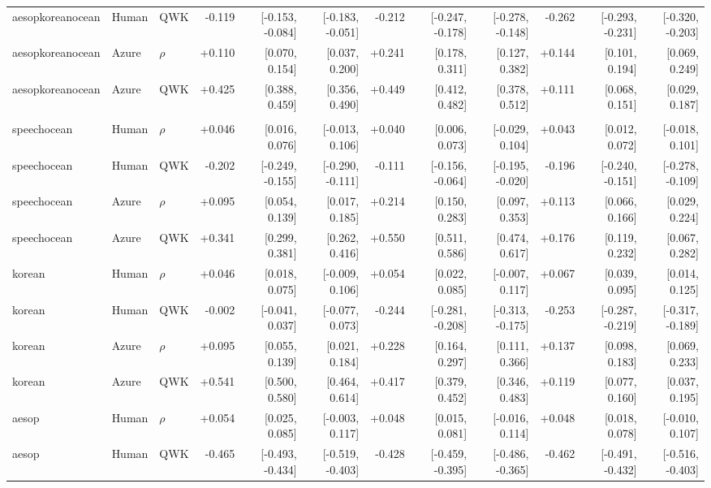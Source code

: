 \documentclass[10pt]{article}
\begin{document}
\begin{landscape}
\begin{longtable}{@{}lllrrrrrrrrr@{}}
aesopkoreanocean & Human & QWK & -0.119 & [-0.153, -0.084] & [-0.183, -0.051] & -0.212 & [-0.247, -0.178] & [-0.278, -0.148] & -0.262 & [-0.293, -0.231] & [-0.320, -0.203]\\
aesopkoreanocean & Azure & $\rho$ & +0.110 & [0.070, 0.154] & [0.037, 0.200] & +0.241 & [0.178, 0.311] & [0.127, 0.382] & +0.144 & [0.101, 0.194] & [0.069, 0.249]\\
aesopkoreanocean & Azure & QWK & +0.425 & [0.388, 0.459] & [0.356, 0.490] & +0.449 & [0.412, 0.482] & [0.378, 0.512] & +0.111 & [0.068, 0.151] & [0.029, 0.187]\\
\addlinespace[2pt]
\midrule\multicolumn{12}{l}{\textbf{D: accuracy MAE}}\\*
speechocean & Human & $\rho$ & +0.046 & [0.016, 0.076] & [-0.013, 0.106] & +0.040 & [0.006, 0.073] & [-0.029, 0.104] & +0.043 & [0.012, 0.072] & [-0.018, 0.101]\\
speechocean & Human & QWK & -0.202 & [-0.249, -0.155] & [-0.290, -0.111] & -0.111 & [-0.156, -0.064] & [-0.195, -0.020] & -0.196 & [-0.240, -0.151] & [-0.278, -0.109]\\
speechocean & Azure & $\rho$ & +0.095 & [0.054, 0.139] & [0.017, 0.185] & +0.214 & [0.150, 0.283] & [0.097, 0.353] & +0.113 & [0.066, 0.166] & [0.029, 0.224]\\
speechocean & Azure & QWK & +0.341 & [0.299, 0.381] & [0.262, 0.416] & +0.550 & [0.511, 0.586] & [0.474, 0.617] & +0.176 & [0.119, 0.232] & [0.067, 0.282]\\
\addlinespace[2pt]
korean & Human & $\rho$ & +0.046 & [0.018, 0.075] & [-0.009, 0.106] & +0.054 & [0.022, 0.085] & [-0.007, 0.117] & +0.067 & [0.039, 0.095] & [0.014, 0.125]\\
korean & Human & QWK & -0.002 & [-0.041, 0.037] & [-0.077, 0.073] & -0.244 & [-0.281, -0.208] & [-0.313, -0.175] & -0.253 & [-0.287, -0.219] & [-0.317, -0.189]\\
korean & Azure & $\rho$ & +0.095 & [0.055, 0.139] & [0.021, 0.184] & +0.228 & [0.164, 0.297] & [0.111, 0.366] & +0.137 & [0.098, 0.183] & [0.069, 0.233]\\
korean & Azure & QWK & +0.541 & [0.500, 0.580] & [0.464, 0.614] & +0.417 & [0.379, 0.452] & [0.346, 0.483] & +0.119 & [0.077, 0.160] & [0.037, 0.195]\\
\addlinespace[2pt]
aesop & Human & $\rho$ & +0.054 & [0.025, 0.085] & [-0.003, 0.117] & +0.048 & [0.015, 0.081] & [-0.016, 0.114] & +0.048 & [0.018, 0.078] & [-0.010, 0.107]\\
aesop & Human & QWK & -0.465 & [-0.493, -0.434] & [-0.519, -0.403] & -0.428 & [-0.459, -0.395] & [-0.486, -0.365] & -0.462 & [-0.491, -0.432] & [-0.516, -0.403]\\

\end{longtable}
\end{landscape}
\end{document}
